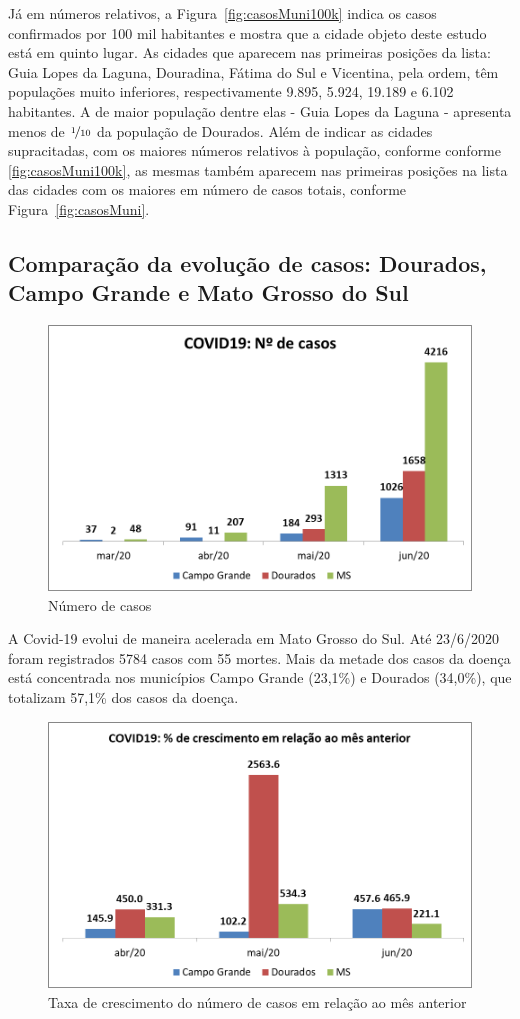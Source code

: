 \documentclass[12pt]{article}
\begin{document}
Já em números relativos, a Figura~\ref{fig:casosMuni100k} indica os casos confirmados por 100 mil habitantes e mostra que a cidade objeto deste estudo está em quinto lugar. As cidades que aparecem nas primeiras posições da lista: Guia Lopes da Laguna, Douradina, Fátima do Sul e Vicentina, pela ordem, têm populações muito inferiores, respectivamente 9.895, 5.924, 19.189 e 6.102 habitantes. A de maior população dentre elas - Guia Lopes da Laguna - apresenta menos de \(\nicefrac{1}{10}\) da população de Dourados. Além de indicar as cidades supracitadas, com os maiores números relativos à população, conforme conforme \ref{fig:casosMuni100k}, as mesmas também aparecem nas primeiras posições na lista das cidades com os maiores em número de casos totais, conforme Figura~\ref{fig:casosMuni}.

\subsection{Comparação da evolução de casos: Dourados, Campo Grande e Mato Grosso do Sul}\label{ssec:DouCGMS}

\begin{figure}[!htb]
  \centering
  \includegraphics[width=.5\textwidth]{figs/douCGMS01.png}
  \caption{Número de casos}
  \label{fig:douCGMScaos}
  \end{figure}


A Covid-19 evolui de maneira acelerada em Mato Grosso do Sul. Até 23/6/2020 foram registrados 5784 casos com 55 mortes. Mais da metade dos casos da doença está concentrada nos municípios Campo Grande (23,1\%) e Dourados (34,0\%), que totalizam 57,1\% dos casos da doença.

\begin{figure}[!htb]
  \centering
  \includegraphics[width=.5
  \textwidth]{figs/douCGMS02.png}
  \caption{Taxa de crescimento do número de casos em relação ao mês anterior}
  \label{fig:douCGMStaxa}
  \end{figure}
\end{document}
